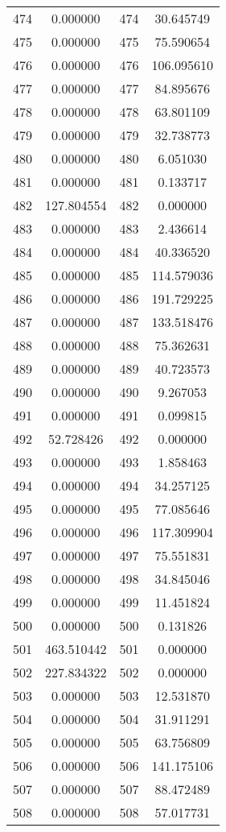 \documentclass[12pt]{article}
\begin{document}
\begin{longtable}{@{}cccc@{}}
474 & 0.000000 & 474 & 30.645749 \\
475 & 0.000000 & 475 & 75.590654 \\
476 & 0.000000 & 476 & 106.095610 \\
477 & 0.000000 & 477 & 84.895676 \\
478 & 0.000000 & 478 & 63.801109 \\
479 & 0.000000 & 479 & 32.738773 \\
480 & 0.000000 & 480 & 6.051030 \\
481 & 0.000000 & 481 & 0.133717 \\
482 & 127.804554 & 482 & 0.000000 \\
483 & 0.000000 & 483 & 2.436614 \\
484 & 0.000000 & 484 & 40.336520 \\
485 & 0.000000 & 485 & 114.579036 \\
486 & 0.000000 & 486 & 191.729225 \\
487 & 0.000000 & 487 & 133.518476 \\
488 & 0.000000 & 488 & 75.362631 \\
489 & 0.000000 & 489 & 40.723573 \\
490 & 0.000000 & 490 & 9.267053 \\
491 & 0.000000 & 491 & 0.099815 \\
492 & 52.728426 & 492 & 0.000000 \\
493 & 0.000000 & 493 & 1.858463 \\
494 & 0.000000 & 494 & 34.257125 \\
495 & 0.000000 & 495 & 77.085646 \\
496 & 0.000000 & 496 & 117.309904 \\
497 & 0.000000 & 497 & 75.551831 \\
498 & 0.000000 & 498 & 34.845046 \\
499 & 0.000000 & 499 & 11.451824 \\
500 & 0.000000 & 500 & 0.131826 \\
501 & 463.510442 & 501 & 0.000000 \\
502 & 227.834322 & 502 & 0.000000 \\
503 & 0.000000 & 503 & 12.531870 \\
504 & 0.000000 & 504 & 31.911291 \\
505 & 0.000000 & 505 & 63.756809 \\
506 & 0.000000 & 506 & 141.175106 \\
507 & 0.000000 & 507 & 88.472489 \\
508 & 0.000000 & 508 & 57.017731 \\

\end{longtable}
\end{document}
